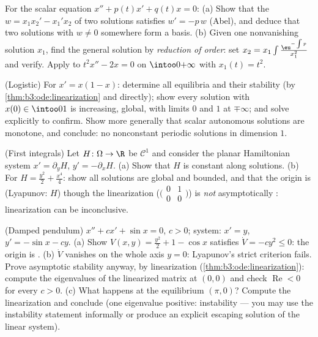 \begin{exercise}[$\star\star$]\label{exo:b3:ode:5}
For the scalar equation $x'' + p(t)x' + q(t)x = 0$:
(a) Show that the  $w = x_1x_2' - x_1'x_2$ of two
solutions satisfies $w' = -p\,w$ (Abel), and deduce that two
solutions with $w \neq 0$ somewhere form a basis.
(b) Given one nonvanishing solution $x_1$, find the general
solution by \emph{reduction of order}: set $x_2 = x_1\int
\frac{\eu^{-\int p}}{x_1^2}$ and verify. Apply to $t^2x'' -
2x = 0$ on $\intoo0{+\infty}$ with $x_1(t) = t^2$.
\end{exercise}

\begin{exercise}[$\star\star$]\label{exo:b3:ode:6}
(Logistic) For $x' = x(1 - x)$: determine all equilibria and
their stability (by \cref{thm:b3:ode:linearization} and
directly); show every solution with $x(0) \in \intoo01$ is
increasing, global, with limits $0$ and $1$ at $\mp\infty$;
and solve explicitly to confirm. Show more generally that
scalar autonomous solutions are monotone, and conclude:
no nonconstant periodic solutions in dimension $1$.
\end{exercise}

\begin{exercise}[$\star\star$]\label{exo:b3:ode:7}
(First integrals) Let $H \colon \Omega \to \R$ be $\mathcal
C^1$ and consider the planar Hamiltonian system $x' =
\partial_yH$, $y' = -\partial_xH$.
(a) Show that $H$ is constant along solutions.
(b) For $H = \frac{y^2}2 + \frac{x^4}4$: show all solutions
are global and bounded, and that the origin is 
(Lyapunov: $H$) though the linearization
($\bigl(\begin{smallmatrix}0&1\\0&0\end{smallmatrix}\bigr)$)
is \emph{not} asymptotically : linearization can be
inconclusive.
\end{exercise}

\begin{exercise}[$\star\star\star$]\label{exo:b3:ode:8}
(Damped pendulum) $x'' + cx' + \sin x = 0$, $c > 0$; system:
$x' = y$, $y' = -\sin x - cy$.
(a) Show $V(x, y) = \frac{y^2}2 + 1 - \cos x$ satisfies $\dot
V = -cy^2 \leq 0$: the origin is .
(b) $\dot V$ vanishes on the whole axis $y = 0$: Lyapunov's
strict criterion fails. Prove asymptotic stability anyway,
by linearization (\cref{thm:b3:ode:linearization}): compute
the eigenvalues of the linearized matrix at $(0,0)$ and check
$\operatorname{Re} < 0$ for every $c > 0$.
(c) What happens at the equilibrium $(\pi, 0)$? Compute the
linearization and conclude (one eigenvalue positive:
instability --- you may use the instability statement
informally or produce an explicit escaping solution of the
linear system).
\end{exercise}

